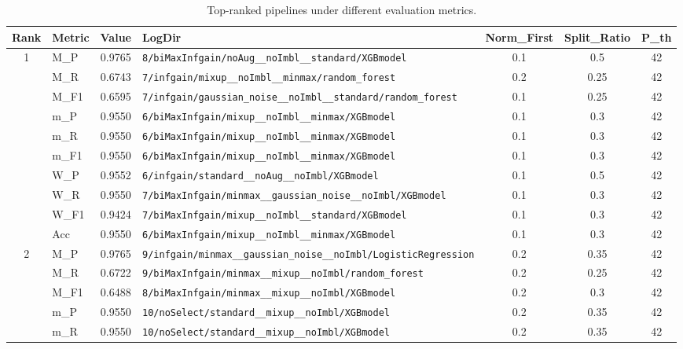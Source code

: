 \begin{table}[htbp]
\caption{Top-ranked pipelines under different evaluation metrics.}
\label{tab:rank_metric_vertical}
\centering
\small
\setlength{\tabcolsep}{4pt}
\begin{tabular}{|c|l|c|>{\ttfamily\footnotesize}p{7.2cm}|c|c|c|}
\hline
Rank & Metric & Value & LogDir & Norm\_First & Split\_Ratio & P\_th \\
\hline
\multirow{10}{*}{1} & M\_P & 0.9765 & \texttt{8/biMaxInfgain/noAug\_\_noImbl\_\_standard/XGBmodel} & 0.1 & 0.5  & 42 \\ 
 & M\_R & 0.6743 & \texttt{7/infgain/mixup\_\_noImbl\_\_minmax/random\_forest} & 0.2 & 0.25  & 42 \\ 
 & M\_F1 & 0.6595 & \texttt{7/infgain/gaussian\_noise\_\_noImbl\_\_standard/random\_forest} & 0.1 & 0.25  & 42 \\ 
 & m\_P & 0.9550 & \texttt{6/biMaxInfgain/mixup\_\_noImbl\_\_minmax/XGBmodel} & 0.1 & 0.3  & 42 \\ 
 & m\_R & 0.9550 & \texttt{6/biMaxInfgain/mixup\_\_noImbl\_\_minmax/XGBmodel} & 0.1 & 0.3  & 42 \\ 
 & m\_F1 & 0.9550 & \texttt{6/biMaxInfgain/mixup\_\_noImbl\_\_minmax/XGBmodel} & 0.1 & 0.3  & 42 \\ 
 & W\_P & 0.9552 & \texttt{6/infgain/standard\_\_noAug\_\_noImbl/XGBmodel} & 0.1 & 0.5  & 42 \\ 
 & W\_R & 0.9550 & \texttt{7/biMaxInfgain/minmax\_\_gaussian\_noise\_\_noImbl/XGBmodel} & 0.1 & 0.3  & 42 \\ 
 & W\_F1 & 0.9424 & \texttt{7/biMaxInfgain/mixup\_\_noImbl\_\_standard/XGBmodel} & 0.1 & 0.3  & 42 \\ 
 & Acc & 0.9550 & \texttt{6/biMaxInfgain/mixup\_\_noImbl\_\_minmax/XGBmodel} & 0.1 & 0.3  & 42 \\ 
\hline
\multirow{10}{*}{2} & M\_P & 0.9765 & \texttt{9/infgain/minmax\_\_gaussian\_noise\_\_noImbl/LogisticRegression} & 0.2 & 0.35  & 42 \\ 
 & M\_R & 0.6722 & \texttt{9/biMaxInfgain/minmax\_\_mixup\_\_noImbl/random\_forest} & 0.2 & 0.25  & 42 \\ 
 & M\_F1 & 0.6488 & \texttt{8/biMaxInfgain/minmax\_\_mixup\_\_noImbl/XGBmodel} & 0.2 & 0.3  & 42 \\ 
 & m\_P & 0.9550 & \texttt{10/noSelect/standard\_\_mixup\_\_noImbl/XGBmodel} & 0.2 & 0.35  & 42 \\ 
 & m\_R & 0.9550 & \texttt{10/noSelect/standard\_\_mixup\_\_noImbl/XGBmodel} & 0.2 & 0.35  & 42 \\ 

\end{tabular}
\end{table}
